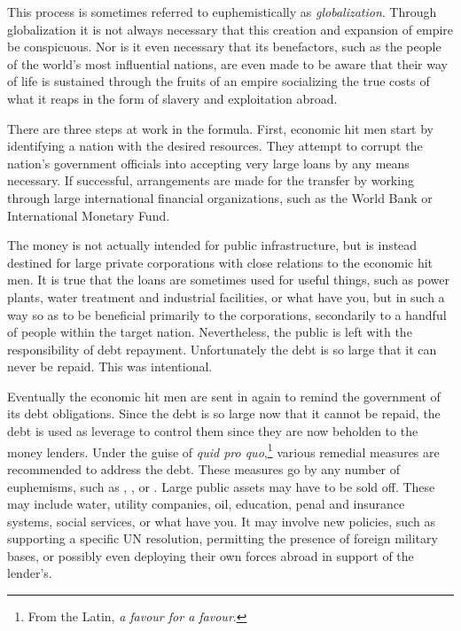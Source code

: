 This process is sometimes referred to euphemistically as {\it globalization}. Through globalization it is not always necessary that this creation and expansion of empire be conspicuous. Nor is it even necessary that its benefactors, such as the people of the world's most influential nations, are even made to be aware that their way of life is sustained through the fruits of an empire socializing the true costs of what it reaps in the form of slavery and exploitation abroad.

There are three steps at work in the formula. First, economic hit men start by identifying a nation with the desired resources. They attempt to corrupt the nation's government officials into accepting very large loans by any means necessary. If successful, arrangements are made for the transfer by working through large international financial organizations, such as the World Bank or International Monetary Fund.

The money is not actually intended for public infrastructure, but is instead destined for large private corporations with close relations to the economic hit men. It is true that the loans are sometimes used for useful things, such as power plants, water treatment and industrial facilities, or what have you, but in such a way so as to be beneficial primarily to the corporations, secondarily to a handful of people within the target nation. Nevertheless, the public is left with the responsibility of debt repayment. Unfortunately the debt is so large that it can never be repaid. This was intentional.

Eventually the economic hit men are sent in again to remind the government of its debt obligations. Since the debt is so large now that it cannot be repaid, the debt is used as leverage to control them since they are now beholden to the money lenders. Under the guise of {\it quid pro quo},\footnote{From the Latin, {\it a favour for a favour}.} various remedial measures are recommended to address the debt. These measures go by any number of euphemisms, such as , , or . Large public assets may have to be sold off. These may include water, utility companies, oil, education, penal and insurance systems, social services, or what have you. It may involve new policies, such as supporting a specific UN resolution, permitting the presence of foreign military bases, or possibly even deploying their own forces abroad in support of the lender's.


